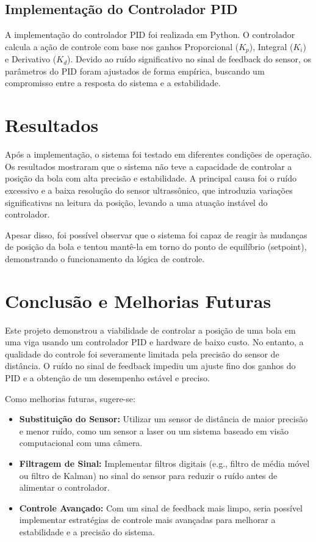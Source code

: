 \documentclass[a4paper, 11pt]{article}
\begin{document}
\subsection{Implementação do Controlador PID}
A implementação do controlador PID foi realizada em Python. O controlador calcula a ação de controle com base nos ganhos Proporcional ($K_p$), Integral ($K_i$) e Derivativo ($K_d$). Devido ao ruído significativo no sinal de feedback do sensor, os parâmetros do PID foram ajustados de forma empírica, buscando um compromisso entre a resposta do sistema e a estabilidade.

\section{Resultados}
Após a implementação, o sistema foi testado em diferentes condições de operação. Os resultados mostraram que o sistema não teve a capacidade de controlar a posição da bola com alta precisão e estabilidade. A principal causa foi o ruído excessivo e a baixa resolução do sensor ultrassônico, que introduzia variações significativas na leitura da posição, levando a uma atuação instável do controlador.

Apesar disso, foi possível observar que o sistema foi capaz de reagir às mudanças de posição da bola e tentou mantê-la em torno do ponto de equilíbrio (setpoint), demonstrando o funcionamento da lógica de controle.

\section{Conclusão e Melhorias Futuras}
Este projeto demonstrou a viabilidade de controlar a posição de uma bola em uma viga usando um controlador PID e hardware de baixo custo. No entanto, a qualidade do controle foi severamente limitada pela precisão do sensor de distância. O ruído no sinal de feedback impediu um ajuste fino dos ganhos do PID e a obtenção de um desempenho estável e preciso.

Como melhorias futuras, sugere-se:
\begin{itemize}
    \item \textbf{Substituição do Sensor:} Utilizar um sensor de distância de maior precisão e menor ruído, como um sensor a laser ou um sistema baseado em visão computacional com uma câmera.
    \item \textbf{Filtragem de Sinal:} Implementar filtros digitais (e.g., filtro de média móvel ou filtro de Kalman) no sinal do sensor para reduzir o ruído antes de alimentar o controlador.
    \item \textbf{Controle Avançado:} Com um sinal de feedback mais limpo, seria possível implementar estratégias de controle mais avançadas para melhorar a estabilidade e a precisão do sistema.
\end{itemize}
\end{document}
